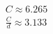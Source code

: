 \documentclass[preview]{standalone}
\begin{document}
\begin{align*}
C \approx 6.265 \\\frac{C}{d} \approx 3.133
\end{align*}
\end{document}
